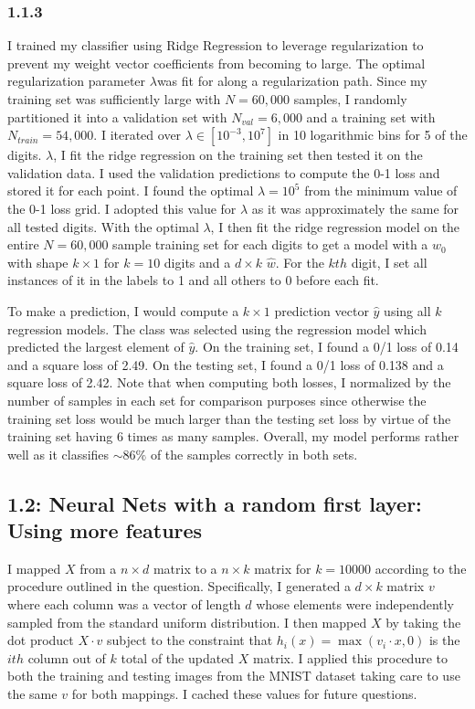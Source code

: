 \documentclass[12pt]{amsart}
\begin{document}
\subsubsection*{1.1.3}

I trained my classifier using Ridge Regression to leverage regularization to prevent my weight vector coefficients from becoming to large.  The optimal regularization parameter $\lambda$was fit for along a regularization path.  Since my training set was sufficiently large with $N = 60,000$ samples, I randomly partitioned it into a validation set with $N_{val} = 6,000$ and a training set with $N_{train} = 54,000$.  I iterated over $\lambda \in [10^{-3},10^{7}]$ in 10 logarithmic bins for 5 of the digits. $\lambda$, I fit the ridge regression on the training set then tested it on the validation data.  I used the validation predictions to compute the 0-1 loss and stored it for each point.  I found the optimal $\lambda = 10^5$ from the minimum value of the 0-1 loss grid.  I adopted this value for $\lambda$ as it was approximately the same for all tested digits.  With the optimal $\lambda$, I then fit the ridge regression model on the entire $N = 60,000$ sample training set for each digits to get a model with a $w_0$ with shape $k \times 1$ for $k = 10$ digits and a $d \times k$ $\hat{w}$.  For the $kth$ digit, I set all instances of it in the labels to 1 and all others to 0 before each fit.  

To make a prediction, I would compute a $k \times 1$ prediction vector $\hat{y}$ using all $k$ regression models.  The class was selected using the regression model which predicted the largest element of $\hat{y}$.  On the training set, I found a 0/1 loss of 0.14 and a square loss of 2.49.  On the testing set, I found a 0/1 loss of 0.138 and a square loss of 2.42.  Note that when computing both losses, I normalized by the number of samples in each set for comparison purposes since otherwise the training set loss would be much larger than the testing set loss by virtue of the training set having 6 times as many samples.  Overall, my model performs rather well as it classifies ${\sim}86\%$ of the samples correctly in both sets.

\subsection*{1.2: Neural Nets with a random first layer: Using more features}

I mapped $X$ from a $n \times d$ matrix to a $n \times k$ matrix for $k=10000$ according to the procedure outlined in the question.  Specifically, I generated a $d \times k$ matrix $v$ where each column was a vector of length $d$ whose elements were independently sampled from the standard uniform distribution.  I then mapped $X$ by taking the dot product $X \cdot v$ subject to the constraint that $h_i(x) = \max{(v_i \cdot x,0)}$ is the $ith$ column out of $k$ total of the updated $X$ matrix.  I applied this procedure to both the training and testing images from the MNIST dataset taking care to use the same $v$ for both mappings.  I cached these values for future questions.
\end{document}
